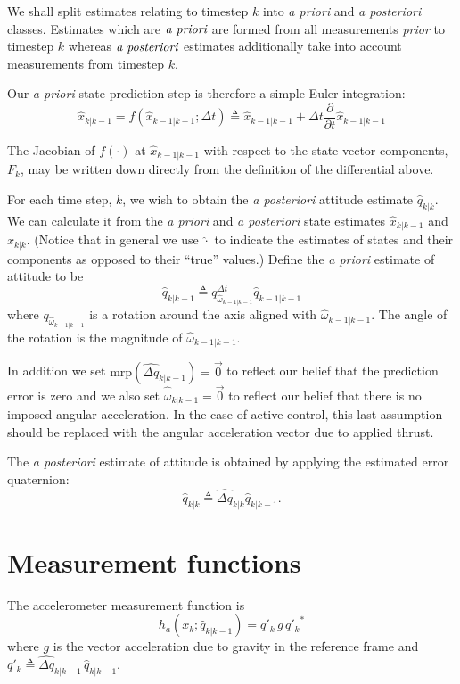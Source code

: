 \documentclass[a4paper]{paper}
\begin{document}
We shall split estimates relating to timestep $k$ into \emph{a priori} and
\emph{a posteriori} classes. Estimates which are $\emph{a priori}$ are formed
from all measurements \emph{prior} to timestep $k$ whereas $\emph{a
posteriori}$ estimates additionally take into account measurements from timestep
$k$.

Our \emph{a priori} state prediction step is therefore a simple Euler integration:
$$
\hat{x}_{k|k-1} = f\left(\hat{x}_{k-1|k-1}; \Delta t\right)
\triangleq \hat{x}_{k-1|k-1} + \Delta t \frac{\partial}{\partial t} \hat{x}_{k-1|k-1}
$$

The Jacobian of $f(\cdot)$ at $\hat{x}_{k-1|k-1}$ with respect to the state
vector components, $F_k$, may be written down directly from the definition of
the differential above.

For each time step, $k$, we wish to obtain the \emph{a posteriori} attitude
estimate $\hat{q}_{k|k}$. We can calculate it from the \emph{a priori} and
\emph{a posteriori} state estimates $\hat{x}_{k|k-1}$ and $\hat{x}_{k|k}$.
(Notice that in general we use $\hat{\cdot}$ to indicate the estimates of states
and their components as opposed to their ``true'' values.) Define the \emph{a
priori} estimate of attitude to be
$$
\hat{q}_{k|k-1} \triangleq q^{\Delta t}_{\hat{\omega}_{k-1|k-1}}
\hat{q}_{k-1|k-1}
$$
where $q_{\hat{\omega}_{k-1|k-1}}$ is a rotation around the axis aligned with
$\hat{\omega}_{k-1|k-1}$. The angle of the rotation is the magnitude of
$\hat{\omega}_{k-1|k-1}$.

In addition we set $\mbox{mrp}(\hat{\Delta q}_{k|k-1}) = \vec{0}$ to reflect our
belief that the prediction error is zero and we also set
$\hat{\dot{\omega}}_{k|k-1} = \vec{0}$ to reflect our belief that there is no
imposed angular acceleration. In the case of active control, this last
assumption should be replaced with the angular acceleration vector due to
applied thrust.

The \emph{a posteriori} estimate of attitude is obtained by applying the
estimated error quaternion:
$$
\hat{q}_{k|k} \triangleq \hat{\Delta q}_{k|k} \hat{q}_{k|k-1}.
$$

\section{Measurement functions}

The accelerometer measurement function is
$$
h_a(x_k; \hat{q}_{k|k-1}) = q'_k \, g \, {q'_k}^*
$$
where $g$ is the vector acceleration due to gravity in the reference frame and
$q'_k \triangleq \hat{\Delta q}_{k|k-1} \, \hat{q}_{k|k-1}$. 
\end{document}
